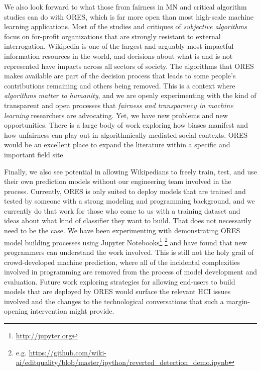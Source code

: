 We also look forward to what those from fairness in MN and critical algorithm studies can do with ORES, which is far more open than most high-scale machine learning applications. Most of the studies and critiques of \emph{subjective algorithms}\cite{tufekci2015algorithms} focus on for-profit organizations that are strongly resistant to external interrogation. Wikipedia is one of the largest and arguably most impactful information resources in the world, and decisions about what is and is not represented have impacts across all sectors of society.  The algorithms that ORES makes available are part of the decision process that leads to some people's contributions remaining and others being removed.  This is a context where \emph{algorithms matter to humanity}, and we are openly experimenting with the kind of transparent and open processes that \emph{fairness and transparency in machine learning} researchers are advocating.  Yet, we have new problems and new opportunities.  There is a large body of work exploring how biases manifest and how unfairness can play out in algorithmically mediated social contexts.  ORES would be an excellent place to expand the literature within a specific and important field site.

Finally, we also see potential in allowing Wikipedians to freely train, test, and use their own prediction models without our engineering team involved in the process.  Currently, ORES is only suited to deploy models that are trained and tested by someone with a strong modeling and programming background, and we currently do that work for those who come to us with a training dataset and ideas about what kind of classifier they want to build.  That does not necessarily need to be the case.  We have been experimenting with demonstrating ORES model building processes using Jupyter Notebooks\footnote{\url{http://jupyter.org}} \footnote{e.g. \url{ https://github.com/wiki-ai/editquality/blob/master/ipython/reverted_detection_demo.ipynb}} and have found that new programmers can understand the work involved.  This is still not the holy grail of crowd-developed machine prediction, where all of the incidental complexities involved in programming are removed from the process of model development and evaluation.  Future work exploring strategies for allowing end-users to build models that are deployed by ORES would surface the relevant HCI issues involved and the changes to the technological conversations that such a margin-opening intervention might provide.
